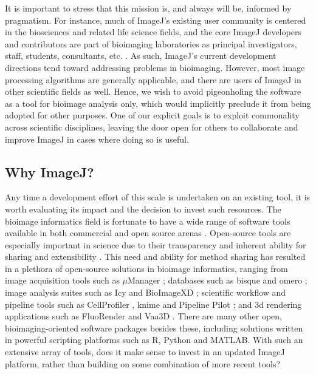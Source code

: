 \documentclass{bmcart}
\begin{document}
It is important to stress that this mission is, and always will be, informed
by pragmatism. For instance, much of ImageJ's existing user community is
centered in the biosciences and related life science fields, and the core
ImageJ developers and contributors are part of bioimaging laboratories as
principal investigators, staff, students, consultants, etc.
\cite{imagej_contributors}. As such, ImageJ's current development directions
tend toward addressing problems in bioimaging. However, most image processing
algorithms are generally applicable, and there are users of ImageJ in other
scientific fields as well. Hence, we wish to avoid pigeonholing the software
as a tool for bioimage analysis only, which would implicitly preclude it from
being adopted for other purposes. One of our explicit goals is to exploit
commonality across scientific disciplines, leaving the door open for others
to collaborate and improve ImageJ in cases where doing so is useful.

\subsection*{Why ImageJ?}
Any time a development effort of this scale is undertaken on an existing tool,
it is worth evaluating its impact and the decision to invest such resources.
The bioimage informatics field \cite{bioimage_informatics} is fortunate to have
a wide range of software tools available in both commercial and open source
arenas \cite{bioimaging_software_review}. Open-source tools are especially
important in science due to their transparency and inherent ability for sharing
and extensibility \cite{bioimaging_cell_biology}. This need and ability for
method sharing has resulted in a plethora of open-source solutions in bioimage
informatics, ranging from image acquisition tools such as $\mu$Manager
\cite{micro_manager_2010, micro_manager_2014}; databases such as
\acrfull{bisque} \cite{bisque} and \acrfull{omero} \cite{omero}; image analysis
suites such as Icy \cite{icy} and BioImageXD \cite{bioimagexd}; scientific
workflow and pipeline tools such as CellProfiler \cite{cellprofiler,
cellprofiler_2011}, \acrfull{knime} \cite{knime, knip} and Pipeline Pilot
\cite{workflow_systems}; and \acrfull{3d} rendering applications such as
FluoRender \cite{fluorender} and Vaa3D \cite{vaa3d}. There are many other open,
bioimaging-oriented software packages besides these, including solutions
written in powerful scripting platforms such as R, Python and MATLAB. With such
an extensive array of tools, does it make sense to invest in an updated ImageJ
platform, rather than building on some combination of more recent tools?
\end{document}

